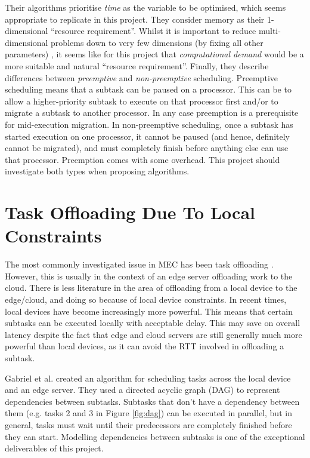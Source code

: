 \documentclass[]{UCD_CS_FYP_Report}
\begin{document}
Their algorithms prioritise \textit{time} as the variable to be optimised, which seems appropriate to replicate in this project. They consider memory as their 1-dimensional \enquote{resource requirement}. Whilst it is important to reduce multi-dimensional problems down to very few dimensions (by fixing all other parameters) \cite{chipman2021letspracticepreachplanning}, it seems like for this project that \textit{computational demand} would be a more suitable and natural \enquote{resource requirement}.
\newpage
Finally, they describe differences between \textit{preemptive} and \textit{non-preemptive} scheduling. Preemptive scheduling means that a subtask can be paused on a processor. This can be to allow a higher-priority subtask to execute on that processor first and/or to migrate a subtask to another processor. In any case preemption is a prerequisite for mid-execution migration. In non-preemptive scheduling, once a subtask has started execution on one processor, it cannot be paused (and hence, definitely cannot be migrated), and must completely finish before anything else can use that processor. Preemption comes with some overhead. This project should investigate both types when proposing algorithms.

\section{Task Offloading Due To Local Constraints} \label{Task Offloading Due To Local Constraints}
The most commonly investigated issue in MEC has been task offloading \cite{mohammad2023offloading}. However, this is usually in the context of an edge server offloading work to the cloud. There is less literature in the area of offloading from a local device to the edge/cloud, and doing so because of local device constraints. In recent times, local devices have become increasingly more powerful. This means that certain subtasks can be executed locally with acceptable delay. This may save on overall latency despite the fact that edge and cloud servers are still generally much more powerful than local devices, as it can avoid the RTT involved in offloading a subtask.

Gabriel et al. \cite{gabriel2024dag} created an algorithm for scheduling tasks across the local device and an edge server. They used a directed acyclic graph (DAG) to represent dependencies between subtasks. Subtasks that don't have a dependency between them (e.g. tasks 2 and 3 in Figure \ref{fig:dag}) can be executed in parallel, but in general, tasks must wait until their predecessors are completely finished before they can start. Modelling dependencies between subtasks is one of the exceptional deliverables of this project.
\end{document}
